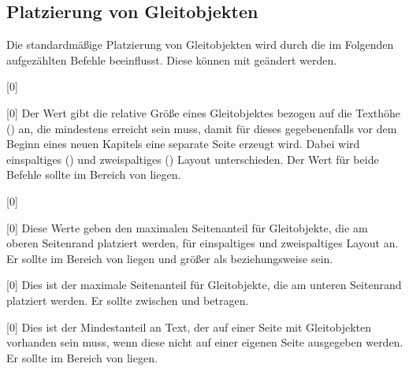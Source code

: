\documentclass[%
  english,ngerman,%
  headings=optiontoheadandtoc,captions=tableheading,numbers=noenddot,%
  chapterpage,cdfoot,%
]{tudscrman}
\begin{document}
\subsection{Platzierung von Gleitobjekten}\label{sec:tat:floats}
Die standardmäßige Platzierung von Gleitobjekten wird durch die im Folgenden 
aufgezählten Befehle beeinflusst. Diese können mit 
 geändert werden.
%
\begin{Declaration}{}[0\floatpagefraction]
\begin{Declaration}{}[0\dblfloatpagefraction]
\printdeclarationlist*
%
Der Wert gibt die relative Größe eines Gleitobjektes bezogen auf die Texthöhe 
() an, die mindestens erreicht sein muss, damit für dieses 
gegebenenfalls vor dem Beginn eines neuen Kapitels eine separate Seite erzeugt 
wird. Dabei wird einspaltiges () und zweispaltiges 
() Layout unterschieden. Der Wert für beide Befehle 
sollte im Bereich von  liegen.
\end{Declaration}
\end{Declaration}

\begin{Declaration}{}[0\topfraction]
\begin{Declaration}{}[0\dbltopfraction]
\printdeclarationlist*
%
Diese Werte geben den maximalen Seitenanteil für Gleitobjekte, die am oberen 
Seitenrand platziert werden, für einspaltiges und zweispaltiges Layout an. Er 
sollte im Bereich von  liegen und größer als 
 beziehungsweise  sein.
\end{Declaration}
\end{Declaration}

\begin{Declaration}{}[0\bottomfraction]
\printdeclarationlist*
%
Dies ist der maximale Seitenanteil für Gleitobjekte, die am unteren Seitenrand 
platziert werden. Er sollte zwischen  und  betragen.
\end{Declaration}

\begin{Declaration}{}[0\textfraction]
\printdeclarationlist*
%
Dies ist der Mindestanteil an Text, der auf einer Seite mit Gleitobjekten 
vorhanden sein muss, wenn diese nicht auf einer eigenen Seite ausgegeben werden. 
Er sollte im Bereich von  liegen.
\end{Declaration}
\end{document}
